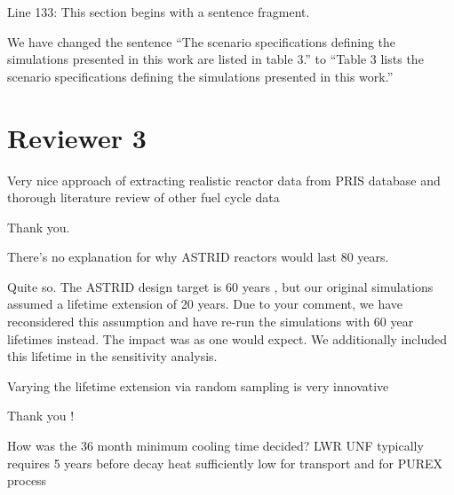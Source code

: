 \documentclass[answers,11pt]{exam}
\begin{document}
\begin{questions}
        \question Line 133: This section begins with a sentence fragment.

        \begin{solution}
                We have changed the sentence 
                ``The scenario specifications defining the simulations
                presented in this work are listed in table 3.''
                to
                ``Table 3 lists the scenario specifications defining the
                simulations presented in this work.''
        \end{solution}


        \section*{Reviewer 3}
        \question Very nice approach of extracting realistic reactor data from 
        PRIS database and thorough literature review of other fuel cycle data
        \begin{solution}
                Thank you.
        \end{solution}


        \question There's no explanation for why ASTRID reactors would last 80 
        years.

        \begin{solution}
                Quite so. The ASTRID design target is 60 years 
                \cite{gauche_generation_2012}, but our original simulations assumed a lifetime
                extension of 20 years. Due to your comment, we have 
                reconsidered this assumption and have re-run the simulations 
                with 60 year lifetimes instead. The impact was as one would 
                expect. We additionally included this lifetime in the 
                sensitivity analysis.
        \end{solution}

        \question Varying the lifetime extension via random sampling is very 
        innovative
        \begin{solution}
                Thank you !
        \end{solution}

        \question How was the 36 month minimum cooling time decided? LWR UNF 
        typically requires 5 years before decay heat sufficiently low for 
        transport and for PUREX process


\end{questions}
\end{document}

